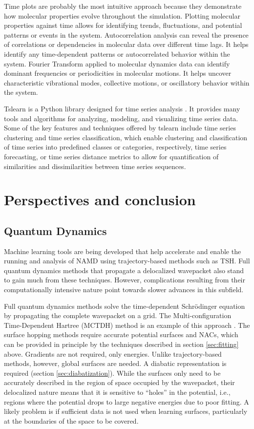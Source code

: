 \documentclass[9pt,bestpractices]{livecoms}
\begin{document}
Time plots are probably the most intuitive approach because they demonstrate how molecular properties evolve throughout the simulation. Plotting molecular properties against time allows for identifying trends, fluctuations, and potential patterns or events in the system. Autocorrelation analysis can reveal the presence of correlations or dependencies in molecular data over different time lags. It helps identify any time-dependent patterns or autocorrelated behavior within the system. Fourier Transform applied to molecular dynamics data can identify dominant frequencies or periodicities in molecular motions. It helps uncover characteristic vibrational modes, collective motions, or oscillatory behavior within the system.

Tslearn is a Python library designed for time series analysis \cite{RN13}. It provides many tools and algorithms for analyzing, modeling, and visualizing time series data. Some of the key features and techniques offered by tslearn include time series clustering and time series classification, which enable clustering and classification of time series into predefined classes or categories, respectively, time series forecasting, or time series distance metrics to allow for quantification of similarities and dissimilarities between time series sequences.



\section{Perspectives and conclusion}

\subsection{Quantum Dynamics}

Machine learning tools are being developed that help accelerate and enable the running and analysis of NAMD using trajectory-based methods such as TSH. Full quantum dynamics methods that propagate a delocalized wavepacket also stand to gain much from these techniques. However, complications resulting from their computationally intensive nature point towards slower advances in this subfield. 

Full quantum dynamics methods solve the time-dependent Schrödinger equation by propagating the complete wavepacket on a grid. The Multi-configuration Time-Dependent Hartree (MCTDH) method is an example of this approach \cite{RN87}. The surface hopping methods require accurate potential surfaces and NACs, which can be provided in principle by the techniques described in section \ref{sec:fitting} above. Gradients are not required, only energies. Unlike trajectory-based methods, however, global surfaces are needed. A diabatic representation is required (section \ref{sec:diabatization}). While the surfaces only need to be accurately described in the region of space occupied by the wavepacket, their delocalized nature means that it is sensitive to “holes” in the potential, i.e., regions where the potential drops to large negative energies due to poor fitting. A likely problem is if sufficient data is not used when learning surfaces, particularly at the boundaries of the space to be covered.
\end{document}
